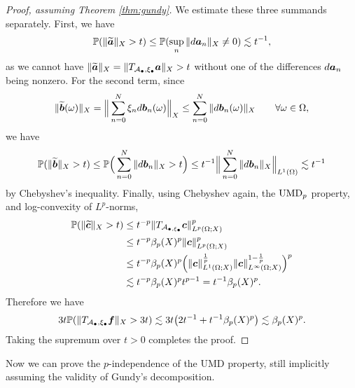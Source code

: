 \begin{proof}[Proof, assuming Theorem \ref{thm:gundy}]
  We estimate these three summands separately.
  First, we have
  \begin{equation*}
    \begin{aligned}
      \mathbb{P}(\|\widetilde{ \bm{a} }\|_{X} > t)
      \leq \mathbb{P}(\sup_{n} \|d \bm{a}_{n}\|_{X} \neq 0) \lesssim t^{-1},
    \end{aligned}
  \end{equation*}
  as we cannot have $\| \widetilde{ \bm{a} }  \|_{X} = \|T_{ \mathcal{A}_{\bullet}, \xi_{\bullet} } \bm{a}\|_{X}> t$ without one of the differences $d\bm{a}_{n}$ being nonzero.
  For the second term, since
  \begin{equation*}
    \|\widetilde{\bm{b}}(\omega)\|_{X} = \Big\| \sum_{n=0}^{N} \xi_{n} d\bm{b}_{n}(\omega) \Big\|_{X} \leq \sum_{n = 0}^{N} \|d\bm{b}_{n}(\omega)\|_{X} \qquad \forall \omega \in \Omega,
  \end{equation*}
  we have
  \begin{equation*}
    \mathbb{P}(\|\widetilde{\bm{b}}\|_{X} > t) \leq \mathbb{P}\Big( \sum_{n = 0}^{N} \|d\bm{b}_{n}\|_{X} > t \Big)
    \leq t^{-1} \Big\|  \sum_{n = 0}^{N} \|d\bm{b}_{n}\|_{X} \Big\|_{L^1(\Omega)} \lesssim t^{-1}
  \end{equation*}
  by Chebyshev's inequality.
  Finally, using Chebyshev again, the $\mathrm{UMD}_{p}$ property, and log-convexity of $L^p$-norms,
  \begin{equation*}
    \begin{aligned}
      \mathbb{P}(\|\widetilde{\bm{c}}\|_{X} > t)
      &\leq t^{-p}\|T_{\mathcal{A}_{\bullet, \xi_{\bullet}}} \bm{c} \|_{L^p(\Omega;X)}^{p} \\
      &\leq t^{-p} \beta_{p}(X)^{p} \|\bm{c} \|_{L^p(\Omega;X)}^{p} \\
      &\leq t^{-p} \beta_{p}(X)^{p} \Big( \|\bm{c} \|_{L^1(\Omega;X)}^{\frac{1}{p}} \|\bm{c}\|_{L^\infty(\Omega;X)}^{1-\frac{1}{p}} \Big)^{p} \\
      &\lesssim t^{-p} \beta_{p}(X)^{p} t^{p-1} = t^{-1}\beta_{p}(X)^{p} .
    \end{aligned}
  \end{equation*}
  Therefore we have
  \begin{equation*}
    3t\mathbb{P}(\|T_{\mathcal{A}_{\bullet}, \xi_{\bullet}} \bm{f}\|_{X} > 3t)
    \lesssim 3t\big(2t^{-1} + t^{-1} \beta_{p}(X)^{p}\big) \lesssim \beta_{p}(X)^{p}.
  \end{equation*}
  Taking the supremum over $t > 0$ completes the proof.
\end{proof}

Now we can prove the $p$-independence of the UMD property, still implicitly assuming the validity of Gundy's decomposition.

